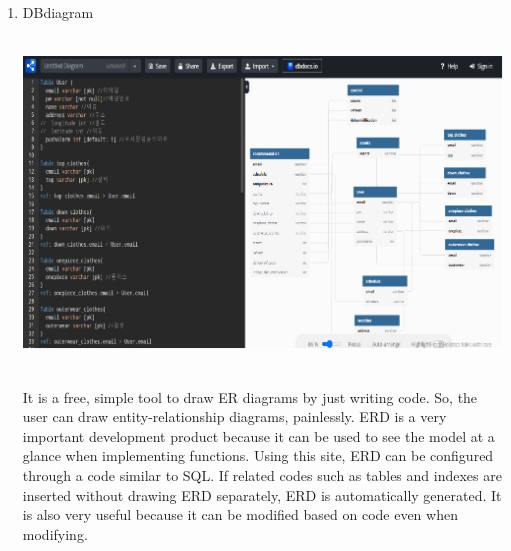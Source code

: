 \documentclass[conference]{IEEEtran}
\begin{document}
\begin{enumerate}
    \item DBdiagram \\ \\
    \centerline{\includegraphics[scale=0.9]{assets/DB.png}}
    \\ It is a free, simple tool to draw ER diagrams by just writing code. So, the user can draw entity-relationship diagrams, painlessly. ERD is a very important development product because it can be used to see the model at a glance when implementing functions. Using this site, ERD can be configured through a code similar to SQL. If related codes such as tables and indexes are inserted without drawing ERD separately, ERD is automatically generated. It is also very useful because it can be modified based on code even when modifying.\\ \\


\end{enumerate}
\end{document}
